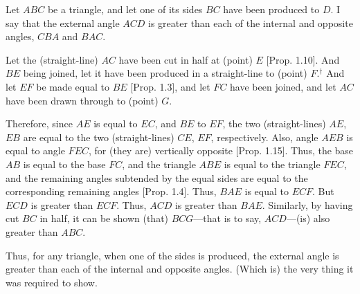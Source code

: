 \begin{Parallel}{}{}
{Let $ABC$ be a triangle, and let one of its sides $BC$ have been produced 
 to $D$. I say that the external angle $ACD$ is greater than each of the
 internal and opposite angles, $CBA$ and $BAC$.
 
 Let the (straight-line) $AC$ have been cut in half at (point) $E$ [Prop. 1.10].
 And $BE$ being joined, let it have been produced in a straight-line to
 (point) $F$.$^\dag$ And let $EF$ be made equal to $BE$ [Prop. 1.3], and let $FC$ have been joined, and let $AC$ have been drawn through to (point) $G$.

 Therefore, since $AE$ is equal to $EC$, and $BE$ to $EF$, the two (straight-lines)
 $AE$, $EB$ are equal to the two (straight-lines) $CE$, $EF$, respectively. 
 Also, angle $AEB$ is equal to angle $FEC$, for (they are)
 vertically opposite [Prop. 1.15]. Thus, the base $AB$ is equal to the base
 $FC$, and the triangle $ABE$ is equal to the triangle $FEC$, and the remaining
 angles subtended by the equal sides are equal to the corresponding remaining angles [Prop. 1.4]. Thus, $BAE$ is equal to $ECF$. But $ECD$ is greater than $ECF$. Thus,
 $ACD$ is greater than $BAE$. Similarly, by having cut $BC$ in half,  it can  be shown (that) $BCG$---that is to say, $ACD$---(is) also greater than $ABC$.
 
 \epsfysize=2.7in
\centerline{}
 
 Thus, for any triangle, when one of the sides is produced, the external angle
is greater than each of the internal and opposite angles. (Which is) the very thing
it was required to show.}
\end{Parallel}


\vspace{7pt}{\footnotesize
\noindent $^\dag$  The implicit assumption that the point $F$ lies in the
 interior of the angle $ABC$ should be counted as an additional postulate.} 
 
